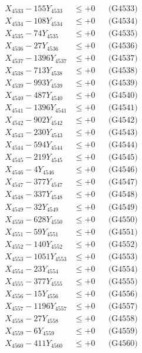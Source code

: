 \documentclass[a4paper,10pt]{article}
\begin{document}
{\begin{align}
X_{4533} - 155Y_{4533} &\leq +0 && \text{(G4533)} \\
X_{4534} - 108Y_{4534} &\leq +0 && \text{(G4534)} \\
X_{4535} - 74Y_{4535} &\leq +0 && \text{(G4535)} \\
X_{4536} - 27Y_{4536} &\leq +0 && \text{(G4536)} \\
X_{4537} - 1396Y_{4537} &\leq +0 && \text{(G4537)} \\
X_{4538} - 713Y_{4538} &\leq +0 && \text{(G4538)} \\
X_{4539} - 993Y_{4539} &\leq +0 && \text{(G4539)} \\
X_{4540} - 487Y_{4540} &\leq +0 && \text{(G4540)} \\
\allowbreak
X_{4541} - 1396Y_{4541} &\leq +0 && \text{(G4541)} \\
X_{4542} - 902Y_{4542} &\leq +0 && \text{(G4542)} \\
X_{4543} - 230Y_{4543} &\leq +0 && \text{(G4543)} \\
X_{4544} - 594Y_{4544} &\leq +0 && \text{(G4544)} \\
X_{4545} - 219Y_{4545} &\leq +0 && \text{(G4545)} \\
X_{4546} - 4Y_{4546} &\leq +0 && \text{(G4546)} \\
X_{4547} - 377Y_{4547} &\leq +0 && \text{(G4547)} \\
X_{4548} - 337Y_{4548} &\leq +0 && \text{(G4548)} \\
X_{4549} - 32Y_{4549} &\leq +0 && \text{(G4549)} \\
X_{4550} - 628Y_{4550} &\leq +0 && \text{(G4550)} \\
\allowbreak
X_{4551} - 59Y_{4551} &\leq +0 && \text{(G4551)} \\
X_{4552} - 140Y_{4552} &\leq +0 && \text{(G4552)} \\
X_{4553} - 1051Y_{4553} &\leq +0 && \text{(G4553)} \\
X_{4554} - 23Y_{4554} &\leq +0 && \text{(G4554)} \\
X_{4555} - 377Y_{4555} &\leq +0 && \text{(G4555)} \\
X_{4556} - 15Y_{4556} &\leq +0 && \text{(G4556)} \\
X_{4557} - 1196Y_{4557} &\leq +0 && \text{(G4557)} \\
X_{4558} - 27Y_{4558} &\leq +0 && \text{(G4558)} \\
X_{4559} - 6Y_{4559} &\leq +0 && \text{(G4559)} \\
X_{4560} - 411Y_{4560} &\leq +0 && \text{(G4560)} \\

\end{align}}
\end{document}
